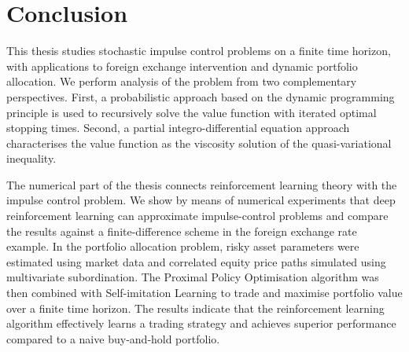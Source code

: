 \label{section: concluding remarks}
\section*{Conclusion}
This thesis studies stochastic impulse control problems on a finite time horizon, with applications to foreign exchange intervention and dynamic portfolio allocation. We perform analysis of the problem from two complementary perspectives. First, a probabilistic approach based on the dynamic programming principle is used to recursively solve the value function with iterated optimal stopping times. Second, a partial integro-differential equation approach characterises the value function as the viscosity solution of the quasi-variational inequality. 

The numerical part of the thesis connects reinforcement learning theory with the impulse control problem. We show by means of numerical experiments that deep reinforcement learning can approximate impulse-control problems and compare the results against a finite-difference scheme in the foreign exchange rate example. In the portfolio allocation problem, risky asset parameters were estimated using market data and correlated equity price paths simulated using multivariate subordination. The Proximal Policy Optimisation algorithm was then combined with Self-imitation Learning to trade and maximise portfolio value over a finite time horizon. The results indicate that the reinforcement learning algorithm effectively learns a trading strategy and achieves superior performance compared to a naive buy‑and‑hold portfolio.

